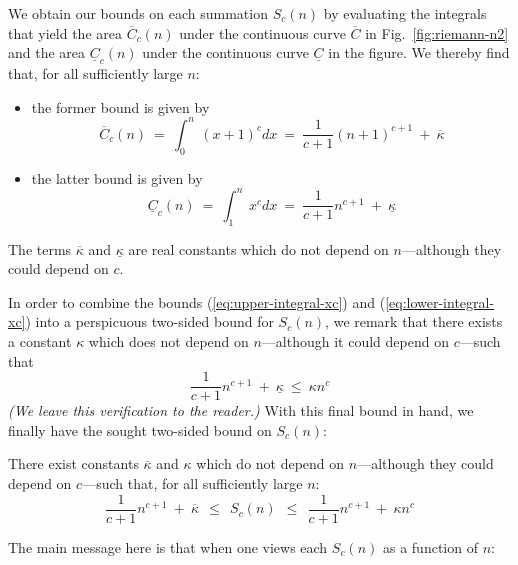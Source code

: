 We obtain our bounds on each summation $S_c(n)$ by evaluating the integrals that yield the area $\overline{C}_c(n)$ under the continuous curve $\overline{C}$ in Fig.~\ref{fig:riemann-n2} and the area $\underline{C}_c(n)$ under the continuous curve $\underline{C}$ in the figure.  We thereby find that, for all sufficiently large $n$:
\begin{itemize}
\item
the former bound is given by
\begin{equation}
\label{eq:upper-integral-xc}
\overline{C}_c(n) \ = \
\int_0^n \ (x+1)^c dx \ = \
 \frac{1}{c+1} (n+1)^{c+1} \ + \ \overline{\kappa}
\end{equation}

\item
the latter bound is given by
\begin{equation}
\label{eq:lower-integral-xc}
\underline{C}_c(n) \ = \
\int_1^n \ x^c dx \ = \ \frac{1}{c+1} n^{c+1} \ + \ \underline{\kappa}
\end{equation}
\end{itemize}
The terms $\overline{\kappa}$ and $\underline{\kappa}$ are real constants which do not depend on $n$---although they could depend on $c$.

\smallskip

In order to combine the bounds (\ref{eq:upper-integral-xc}) and (\ref{eq:lower-integral-xc}) into a perspicuous two-sided bound for $S_c(n)$, we remark that there exists a constant $\kappa$ which does not depend on $n$---although it could depend on $c$---such that
\[ \frac{1}{c+1} n^{c+1} \ + \ \underline{\kappa} \ \leq \ \kappa n^c \]
{\em (We leave this verification to the reader.)}  With this final bound in hand, we finally have the sought two-sided bound on $S_c(n)$:

\begin{prop}
There exist constants $\overline{\kappa}$ and $\kappa$ which do not depend on $n$---although they could depend on $c$---such that, for all sufficiently large $n$:
\begin{equation}
\label{eq:bounds-sum-xc}
\frac{1}{c+1} n^{c+1} \ + \ \overline{\kappa}
  \ \ \leq \ \ S_c(n)
  \ \ \leq \ \ \frac{1}{c+1} n^{c+1} \ + \ \kappa n^c
\end{equation}
\end{prop}

\medskip

\noindent
The main message here is that when one views each $S_c(n)$ as a function of $n$:

